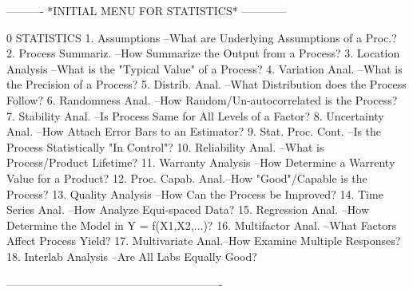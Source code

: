  
 
 
 
 
 
 
 
 
 
 
 
 
 
 
 
 
 
 
 
 
 
 
 
 
 
 
 
 
 
 
 
 
 
 
 
 
 
 
 
 
 
 
 
 
 
 
 
----------  *INITIAL MENU FOR STATISTICS*  ------------
 
0
STATISTICS
   1. Assumptions       --What are Underlying Assumptions of a Proc.?
   2. Process Summariz. --How Summarize the Output from a Process?
   3. Location Analysis --What is the "Typical Value" of a Process?
   4. Variation Anal.   --What is the Precision of a Process?
   5. Distrib. Anal.    --What Distribution does the Process Follow?
   6. Randomness Anal.  --How Random/Un-autocorrelated is the Process?
   7. Stability Anal.   --Is Process Same for All Levels of a Factor?
   8. Uncertainty Anal. --How Attach Error Bars to an Estimator?
   9. Stat. Proc. Cont. --Is the Process Statistically "In Control"?
  10. Reliability Anal. --What is Process/Product Lifetime?
  11. Warranty Analysis --How Determine a Warrenty Value for a Product?
  12. Proc. Capab. Anal.--How "Good"/Capable is the Process?
  13. Quality Analysis  --How Can the Process be Improved?
  14. Time Series Anal. --How Analyze Equi-spaced Data?
  15. Regression Anal.  --How Determine the Model in Y = f(X1,X2,...)?
  16. Multifactor Anal. --What Factors Affect Process Yield?
  17. Multivariate Anal.--How Examine Multiple Responses?
  18. Interlab Analysis --Are All Labs Equally Good?
 
----------------------------------------------------------
 
 
 
 
 
 
 
